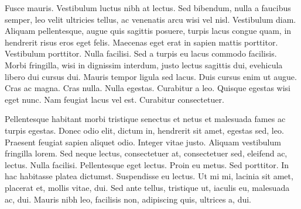 \documentclass[AMA]{WileyNJD-v1}
\begin{document}
Fusce mauris. Vestibulum luctus nibh at lectus. Sed bibendum, nulla a faucibus semper, leo velit ultricies tellus, ac
venenatis arcu wisi vel nisl. Vestibulum diam. Aliquam pellentesque, augue quis sagittis posuere, turpis lacus congue
quam, in hendrerit risus eros eget felis. Maecenas eget erat in sapien mattis porttitor. Vestibulum porttitor. Nulla
facilisi. Sed a turpis eu lacus commodo facilisis. Morbi fringilla, wisi in dignissim interdum, justo lectus sagittis dui, evehicula libero dui cursus dui. Mauris tempor ligula sed lacus. Duis cursus enim ut augue. Cras ac magna. Cras nulla.
Nulla egestas. Curabitur a leo. Quisque egestas wisi eget nunc. Nam feugiat lacus vel est. Curabitur consectetuer.

Pellentesque habitant morbi tristique senectus et netus et malesuada fames ac turpis egestas. Donec odio elit,
dictum in, hendrerit sit amet, egestas sed, leo. Praesent feugiat sapien aliquet odio. Integer vitae justo. Aliquam
vestibulum fringilla lorem. Sed neque lectus, consectetuer at, consectetuer sed, eleifend ac, lectus. Nulla facilisi.
Pellentesque eget lectus. Proin eu metus. Sed porttitor. In hac habitasse platea dictumst. Suspendisse eu lectus. Ut
mi mi, lacinia sit amet, placerat et, mollis vitae, dui. Sed ante tellus, tristique ut, iaculis eu, malesuada ac, dui.
Mauris nibh leo, facilisis non, adipiscing quis, ultrices a, dui.
\end{document}
